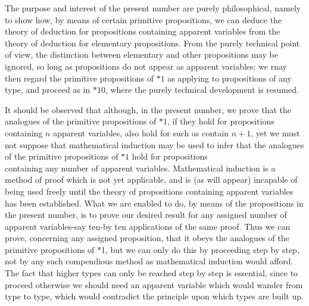 \documentclass[10pt]{article}
\begin{document}
The purpose and interest of the present number are purely philosophical, namely to show how, by means of certain primitive propositions, we can deduce the theory of deduction for propositions containing apparent variables from the theory of deduction for elementary propositions. From the purely technical point of view, the distinction between elementary and other propositions may be ignored, so long as propositions do not appear as apparent variables; we rnay then regard the primitive propositions of $* 1$ as applying to propositions of any type, and proceed as in $* 10$, where the purely technical development is resumed.

It should be observed that although, in the present number, we prove that the analogues of the primitive propositions of $* 1$, if they hold for propositions containing $n$ apparent variables, also hold for such as contain $n+1$, yet we must not suppose that mathematical induction may be used to infer that the analogues of the primitive propositions of $* 1$ hold for propositions\\
containing any number of apparent variables. Mathematical induction is a method of proof which is not yet applicable, and is (as will appear) incapable of being used freely until the theory of propositions containing apparent variables has been established. What we are enabled to do, by means of the propositions in the present number, is to prove our desired result for any assigned number of apparent variables-say ten-by ten applications of the same proof. Thus we can prove, concerning any assigned proposition, that it obeys the analogues of the primitive propositions of *1, but we can only do this by proceeding step by step, not by any such compendious method as mathematical induction would afford. The fact that higher types can only be reached step by step is essential, since to proceed otherwise we should need an apparent variable which would wander from type to type, which would contradict the principle upon which types are built up.
\end{document}
